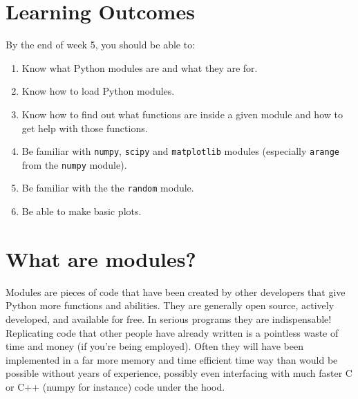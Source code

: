 \label{chap:modules}
\section{Learning Outcomes}

By the end of week 5, you should be able to:

\begin{enumerate}
\item Know what Python modules are and what they are for. 
\item Know how to load Python modules.
\item Know how to find out what functions are inside a given module and how to get help with those functions.
\item Be familiar with \texttt{numpy}, \texttt{scipy} and \texttt{matplotlib} modules (especially \texttt{arange} from the \texttt{numpy} module).
\item Be familiar with the the {\tt random} module.
\item Be able to make basic plots.
\end{enumerate}

\section{What are modules?}

Modules are pieces of code that have been created by other developers that give Python more functions and abilities. They are generally open source, actively developed, and available for free. In serious programs they are indispensable! Replicating code that other people have already written is a pointless waste of time and money (if you're being employed). Often they will have been implemented in a far more memory and time efficient time way than would be possible without years of experience, possibly even interfacing with much faster C or C++ (numpy for instance) code under the hood.





